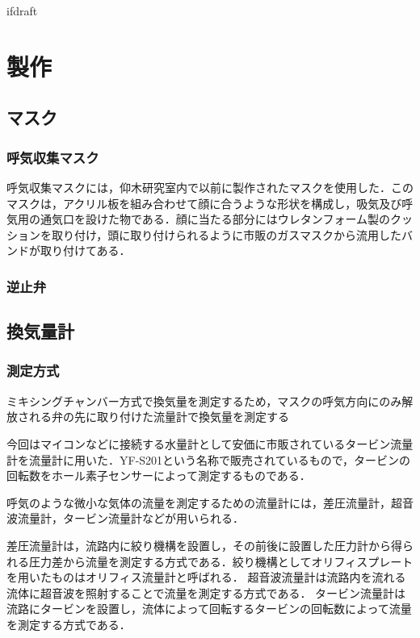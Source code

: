 \expandafter\ifx\csname ifdraft\endcsname\relax
 
\fi

\section{製作}

\subsection{マスク}

\subsubsection{呼気収集マスク}

呼気収集マスクには，仰木研究室内で以前に製作されたマスクを使用した．このマスクは，アクリル板を組み合わせて顔に合うような形状を構成し，吸気及び呼気用の通気口を設けた物である．顔に当たる部分にはウレタンフォーム製のクッションを取り付け，頭に取り付けられるように市販のガスマスクから流用したバンドが取り付けてある．

\subsubsection{逆止弁}

\subsection{換気量計}

\subsubsection{測定方式}

ミキシングチャンバー方式で換気量を測定するため，マスクの呼気方向にのみ解放される弁の先に取り付けた流量計で換気量を測定する

今回はマイコンなどに接続する水量計として安価に市販されているタービン流量計を流量計に用いた．YF-S201という名称で販売されているもので，タービンの回転数をホール素子センサーによって測定するものである．

呼気のような微小な気体の流量を測定するための流量計には，差圧流量計，超音波流量計，タービン流量計などが用いられる．

差圧流量計は，流路内に絞り機構を設置し，その前後に設置した圧力計から得られる圧力差から流量を測定する方式である．絞り機構としてオリフィスプレートを用いたものはオリフィス流量計と呼ばれる．
超音波流量計は流路内を流れる流体に超音波を照射することで流量を測定する方式である．
タービン流量計は流路にタービンを設置し，流体によって回転するタービンの回転数によって流量を測定する方式である．

